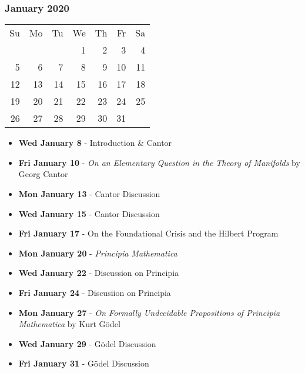 \subsubsection*{January 2020}
\begin{tabular}{rrrrrrr}
Su & Mo & Tu & We & Th & Fr & Sa\\
   &    &    &  1 &  2 &  3 &  4\\ 
 5 &  6 &  7 &  8 &  9 & 10 & 11\\ 
12 & 13 & 14 & 15 & 16 & 17 & 18\\ 
19 & 20 & 21 & 22 & 23 & 24 & 25\\ 
26 & 27 & 28 & 29 & 30 & 31 &\\
\end{tabular}

\begin{itemize}
\item\textbf{Wed January  8} - Introduction \& Cantor
\item\textbf{Fri January 10} - {\em On an Elementary Question in the
Theory of Manifolds} by Georg Cantor
\item\textbf{Mon January 13} - Cantor Discussion
\item\textbf{Wed January 15} - Cantor Discussion
\item\textbf{Fri January 17} - On the Foundational Crisis and the Hilbert Program
\item\textbf{Mon January 20} - {\em Principia Mathematica} 
\item\textbf{Wed January 22} - Discussion on Principia
\item\textbf{Fri January 24} - Discusiion on Principia
\item\textbf{Mon January 27} - {\em On Formally Undecidable
Propositions of Principia Mathematica} by Kurt G\"odel
\item\textbf{Wed January 29} - G\"odel Discussion
\item\textbf{Fri January 31} - G\"odel Discussion
\end{itemize}
\hrulefill

